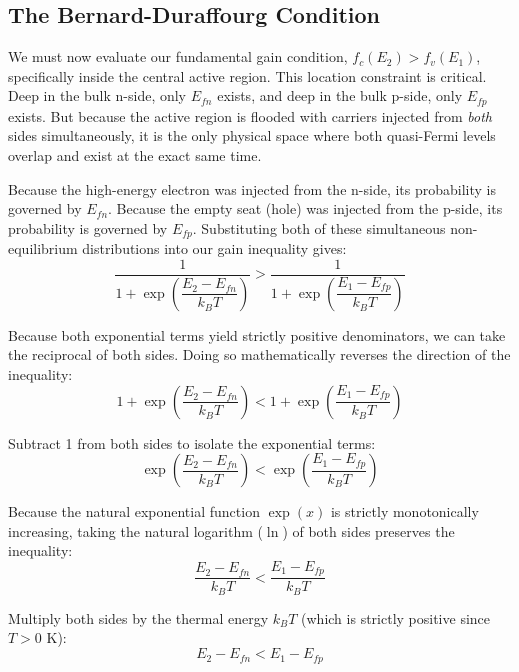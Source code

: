 \subsection{The Bernard-Duraffourg Condition}

We must now evaluate our fundamental gain condition, $f_c(E_2) > f_v(E_1)$, specifically inside the central active region. This location constraint is critical. Deep in the bulk n-side, only $E_{fn}$ exists, and deep in the bulk p-side, only $E_{fp}$ exists. But because the active region is flooded with carriers injected from \emph{both} sides simultaneously, it is the only physical space where both quasi-Fermi levels overlap and exist at the exact same time.

Because the high-energy electron was injected from the n-side, its probability is governed by $E_{fn}$. Because the empty seat (hole) was injected from the p-side, its probability is governed by $E_{fp}$. Substituting both of these simultaneous non-equilibrium distributions into our gain inequality gives:
\begin{equation*}
    \frac{1}{1+\exp\!\left(\dfrac{E_2 - E_{fn}}{k_B T}\right)} > \frac{1}{1+\exp\!\left(\dfrac{E_1 - E_{fp}}{k_B T}\right)}
\end{equation*}

Because both exponential terms yield strictly positive denominators, we can take the reciprocal of both sides. Doing so mathematically reverses the direction of the inequality:
\begin{equation*}
    1 + \exp\!\left(\frac{E_2 - E_{fn}}{k_B T}\right) < 1 + \exp\!\left(\frac{E_1 - E_{fp}}{k_B T}\right)
\end{equation*}

Subtract 1 from both sides to isolate the exponential terms:
\begin{equation*}
    \exp\!\left(\frac{E_2 - E_{fn}}{k_B T}\right) < \exp\!\left(\frac{E_1 - E_{fp}}{k_B T}\right)
\end{equation*}

Because the natural exponential function $\exp(x)$ is strictly monotonically increasing, taking the natural logarithm ($\ln$) of both sides preserves the inequality:
\begin{equation*}
    \frac{E_2 - E_{fn}}{k_B T} < \frac{E_1 - E_{fp}}{k_B T}
\end{equation*}

Multiply both sides by the thermal energy $k_B T$ (which is strictly positive since $T > 0$ K):
\begin{equation*}
    E_2 - E_{fn} < E_1 - E_{fp}
\end{equation*}

